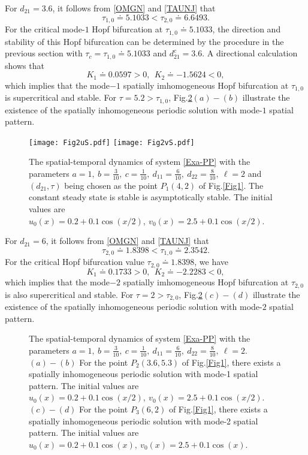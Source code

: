 \documentclass[11pt]{article}
\theoremstyle{definition}
\theoremstyle{remark}
\numberwithin{equation}{section}
\begin{document}
 For   $d_{21}=3.6$, it follows from  \eqref {OMGN}  and   \eqref{TAUNJ} that
 $$\tau_{1,0}\doteq 5.1033 <\tau_{2,0}\doteq 6.6493.$$
For the critical mode-$1$ Hopf bifurcation at $\tau_{1,0}\doteq 5.1033$,  the direction and stability of this Hopf bifurcation  can be determined by the procedure in the previous section with $\tau_c=\tau_{1,0}\doteq 5.1033$ and $d_{21}^c=3.6$. A directional calculation shows that
 $$K_1\doteq 0.0597>0, ~~K_2\doteq -1.5624<0,$$
 which implies that the  mode$-1$  spatially imhomogeneous Hopf bifurcation at  $\tau_{1,0}$ is supercritical and  stable. For $\tau=5.2>\tau_{1,0}$,  Fig.\ref{Fig3}$(a)-(b)$ illustrate the existence of the  spatially inhomogeneous periodic solution with mode-$1$ spatial pattern.
\begin{figure}
\centering
\texttt{[image: Fig2uS.pdf]}
\texttt{[image: Fig2vS.pdf]}
  \caption{The spatial-temporal dynamics of system \eqref{Exa-PP}  with the parameters $a=1, ~b=\frac{3}{10}, ~c=\frac{1}{10}, ~d_{11}=\frac{6}{10}, ~d_{22}=\frac{8}{10},~\ell=2$ and   $\left(d_{21}, \tau\right)$ being chosen as the  point $P_1(4, 2)$ of Fig.\ref{Fig1}. The constant steady state is stable is asymptotically stable.  The initial values are $u_0(x)=0.2+0.1\cos(x/2),~v_0(x)=2.5+0.1\cos(x/2)$.}
  \label{Fig2}
  \end{figure}

 For  $d_{21}=6$, it follows from  \eqref {OMGN}  and    \eqref{TAUNJ} that
 $$\tau_{2,0}\doteq 1.8398 <\tau_{1,0}\doteq 2.3542.$$
For the critical Hopf bifurcation value $\tau_{2,0}\doteq 1.8398$,   we have
 $$K_1\doteq 0.1733>0, ~~K_2\doteq -2.2283<0,$$
 which implies that the  mode$-2$  spatially imhomogeneous Hopf bifurcation at  $\tau_{2,0}$ is also supercritical and  stable.  For $\tau=2>\tau_{2,0}$,  Fig.\ref{Fig3}$(c)-(d)$ illustrate the existence of the  spatially inhomogeneous periodic solution with mode-$2$ spatial pattern.
    \begin{figure}
\centering
{}
\quad
{}
  \caption{The spatial-temporal dynamics of system \eqref{Exa-PP}  with the parameters $a=1, ~b=\frac{3}{10}, ~c=\frac{1}{10}, ~d_{11}=\frac{6}{10}, ~d_{22}=\frac{8}{10},~\ell=2$.  $(a)-(b)$ For the  point $P_2(3.6, 5.3)$ of Fig.\ref{Fig1},  there exists  a spatially inhomogeneous periodic solution with mode-1 spatial pattern. The initial values are $u_0(x)=0.2+0.1\cos(x/2),~v_0(x)=2.5+0.1\cos(x/2)$.
  $(c)-(d)$  For the  point $P_3(6, 2)$ of Fig.\ref{Fig1},  there exists  a spatially inhomogeneous periodic solution with mode-2 spatial pattern.  The initial values are $u_0(x)=0.2+0.1\cos(x),~v_0(x)=2.5+0.1\cos(x)$.}
  \label{Fig3}
  \end{figure}
\end{document}
